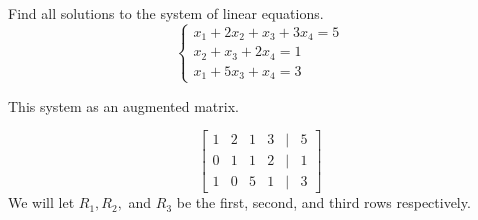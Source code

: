 
\begin{example}
    Find all solutions to the system of linear equations.
    \[\begin{cases}
        x_1 + 2x_2 + x_3 + 3x_4 = 5\\
        x_2 + x_3+2x_4 = 1 \\
        x_1+5x_3+x_4=3
    \end{cases}\]
    \begin{solution}

        This system as an augmented matrix.

        \[\begin{bmatrix}
            1 & 2 & 1 & 3 & \vert & 5 \\
            0 & 1 & 1 & 2 & \vert & 1 \\
            1 & 0 & 5 & 1 & \vert & 3
        \end{bmatrix}\]
        We will let \(R_1, R_2,\) and \(R_3\) be the first, second, and third rows respectively.


\end{solution}
\end{example}
